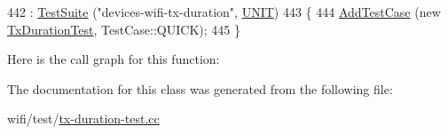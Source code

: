 \begin{DoxyCode}
442   : \hyperlink{classns3_1_1TestSuite_a904b0c40583b744d30908aeb94636d1a}{TestSuite} (\textcolor{stringliteral}{"devices-wifi-tx-duration"}, \hyperlink{classns3_1_1TestSuite_a1ebfcab34ec8161e085e8e3a1855eae0a3885375a3787abf60431f8454b3cadbd}{UNIT})
443 \{
444   \hyperlink{classns3_1_1TestCase_a3718088e3eefd5d6454569d2e0ddd835}{AddTestCase} (\textcolor{keyword}{new} \hyperlink{classTxDurationTest}{TxDurationTest}, TestCase::QUICK);
445 \}
\end{DoxyCode}


Here is the call graph for this function\+:




The documentation for this class was generated from the following file\+:\begin{DoxyCompactItemize}
\item 
wifi/test/\hyperlink{tx-duration-test_8cc}{tx-\/duration-\/test.\+cc}\end{DoxyCompactItemize}
